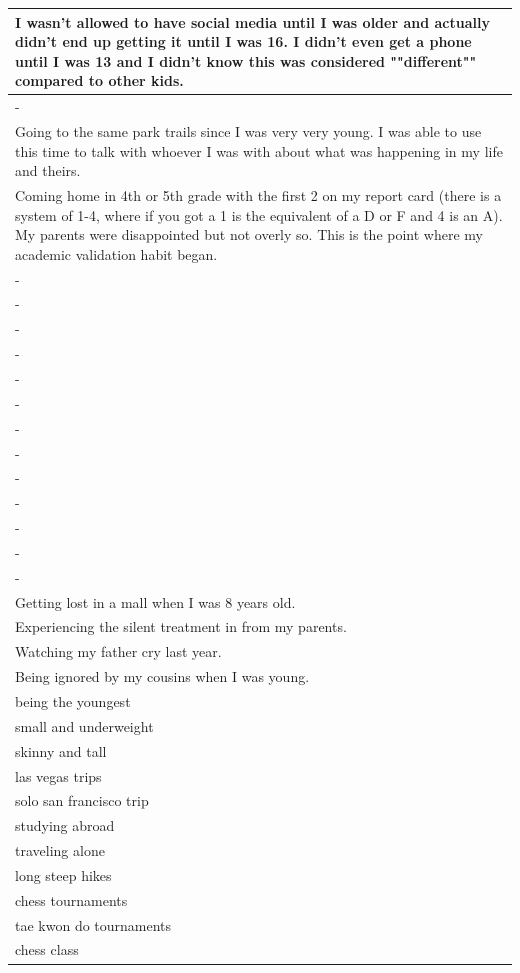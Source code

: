 \documentclass[
  .7em,
  letterpaper,
  DIV=11,
  numbers=noendperiod]{scrartcl}
\begin{document}
\begin{table}
\begin{tabular}{l}
\hline
I wasn't allowed to have social media until I was older and actually didn't end up getting it until I was 16. I didn't even get a phone until I was 13 and I didn't know this was considered ""different"" compared to other kids.\\
\hline
-\\
\hline
Going to the same park trails since I was very very young. I was able to use this time to talk with whoever I was with about what was happening in my life and theirs.\\
\hline
Coming home in 4th or 5th grade with the first 2 on my report card (there is a system of 1-4, where if you got a 1 is the equivalent of a D or F and 4 is an A). My parents were disappointed but not overly so. This is the point where my academic validation habit began.\\
\hline
-\\
\hline
-\\
\hline
-\\
\hline
-\\
\hline
-\\
\hline
-\\
\hline
-\\
\hline
-\\
\hline
-\\
\hline
-\\
\hline
-\\
\hline
-\\
\hline
-\\
\hline
Getting lost in a mall when I was 8 years old.\\
\hline
Experiencing the silent treatment in from my parents.\\
\hline
Watching my father cry last year.\\
\hline
Being ignored by my cousins when I was young.\\
\hline
being the youngest\\
\hline
small and underweight\\
\hline
skinny and tall\\
\hline
las vegas trips\\
\hline
solo san francisco trip\\
\hline
studying abroad\\
\hline
traveling alone\\
\hline
long steep hikes\\
\hline
chess tournaments\\
\hline
tae kwon do tournaments\\
\hline
chess class\\

\end{tabular}
\end{table}
\end{document}
